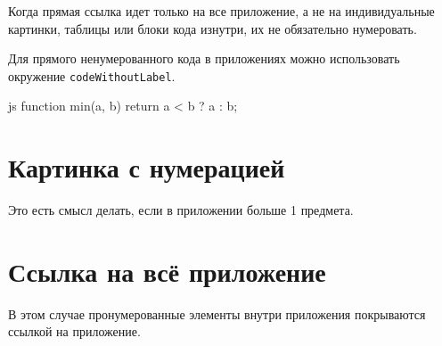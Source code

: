 \documentclass[a4paper,12pt]{report}
\begin{document}
Когда прямая ссылка идет только на все приложение,
а не на индивидуальные картинки, таблицы или блоки кода изнутри,
их не обязательно нумеровать.


Для прямого ненумерованного кода в приложениях можно использовать окружение \verb|codeWithoutLabel|.

\begin{codeWithoutLabel}{js}
function min(a, b) {
  return a < b ? a : b;
}
\end{codeWithoutLabel}

\section{Картинка с нумерацией}\label{numbered_appendix}

Это есть смысл делать, если в приложении больше 1 предмета.



\section{Ссылка на всё приложение}\label{whole_appendix_reference}

В этом случае пронумерованные элементы внутри приложения покрываются ссылкой на приложение.





\end{document}
